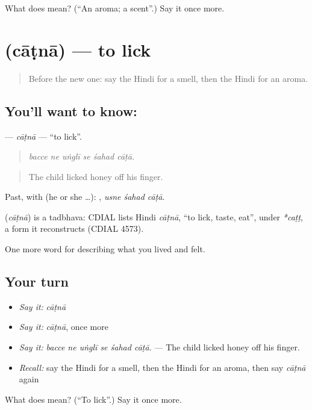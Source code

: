 \begin{tcolorbox}[breakable,colback=teal!4,colframe=teal!35!black,title={Before you move on}]
What does  mean? (\textquotedblleft{}An aroma; a scent\textquotedblright{}.) Say it once more.
\end{tcolorbox}
\section[\texorpdfstring{\hi{चाटना} (cāṭnā)}{चाटना (cāṭnā)}]{ (cāṭnā) — to lick}

\label{lesson:HI-C480-catna}



\begin{quote}
Before the new one: say the Hindi for a smell, then the Hindi for an aroma.
\end{quote}

\subsection*{You'll want to know: }
\textbf{} — \emph{cāṭnā} — \textquotedblleft{}to lick\textquotedblright{}.

\begin{quote}
     
\end{quote}

\begin{quote}
\emph{bacce ne uṅglī se śahad cāṭā.}
\end{quote}

\begin{quote}
The child licked honey off his finger.
\end{quote}

Past, with  (he or she …):   , \emph{usne śahad cāṭā}.

\begin{cousinweb}
\textbf{} (\emph{cāṭnā}) is a tadbhava: CDIAL lists Hindi \emph{cāṭnā}, \textquotedblleft{}to lick, taste, eat\textquotedblright{}, under \emph{*caṭṭ}, a form it reconstructs (CDIAL 4573).
\end{cousinweb}

\begin{grammarlens}[title={What you've built}]
One more word for describing what you lived and felt.
\end{grammarlens}

\subsection*{Your turn}
\begin{itemize}
\raggedright
  \item \emph{Say it:} \emph{cāṭnā}
  \item \emph{Say it:} \emph{cāṭnā}, once more
  \item \emph{Say it:} \emph{bacce ne uṅglī se śahad cāṭā.} — The child licked honey off his finger.
  \item \emph{Recall:} say the Hindi for a smell, then the Hindi for an aroma, then say \emph{cāṭnā} again
\end{itemize}

\begin{tcolorbox}[breakable,colback=teal!4,colframe=teal!35!black,title={Before you move on}]
What does  mean? (\textquotedblleft{}To lick\textquotedblright{}.) Say it once more.
\end{tcolorbox}
